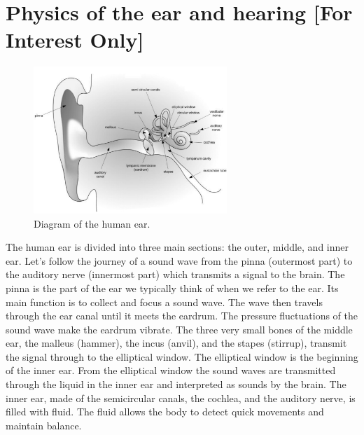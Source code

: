 
\section*{Physics of the ear and hearing [For Interest Only]}
            \nopagebreak
\begin{figure}[H]
\begin{center}
\includegraphics[width=0.65\textwidth]{HumanEar-GrayScale.pdf}
\end{center}
\caption{Diagram of the human ear. }
\label{Human Ear}
\end{figure}


      \label{m38800*id184052}The human ear is divided into three main sections: the outer, middle,
and inner ear. Let's follow the journey of a sound wave from the pinna (outermost part) to the auditory nerve (innermost part) which transmits a signal to the brain. The pinna is the part of the ear we typically think of when we refer to the ear. Its main
function is to collect and focus a sound wave. The wave
then travels through the ear canal until it meets the eardrum. The
pressure fluctuations of the sound wave make the eardrum vibrate.
The three very small bones of the middle ear, the malleus (hammer),
the incus (anvil), and the stapes (stirrup), transmit the signal through
to the elliptical window. The elliptical window is the beginning of the
inner ear. From the elliptical window the sound waves are transmitted through the liquid
in the inner ear and interpreted as sounds by the brain.
The inner ear, made of the semicircular canals, the cochlea,
and the auditory nerve, is filled with fluid. The fluid allows the body to
detect quick movements and maintain balance. 



